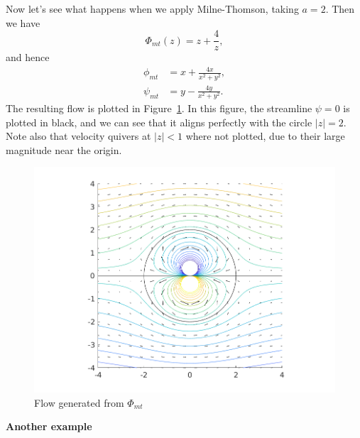 \documentclass{article}
\begin{document}
Now let's see what happens when we apply Milne-Thomson, taking $a = 2$. Then we have
%
\begin{equation*}
    \Phi_{mt}(z) = z + \frac{4}{z}
    ,
\end{equation*}
%
and hence
%
\begin{align*}
    \phi_{mt} &= x + \frac{4 x}{x^2 + y^2}, \\
    \psi_{mt} &= y - \frac{4 y}{x^2 + y^2}
    .
\end{align*}
%
The resulting flow is plotted in Figure~\ref{fig:mt-2}. In this
figure, the streamline $\psi = 0$ is plotted in black, and we can
see that it aligns perfectly with the circle $|z| = 2$. Note also that
velocity quivers at $|z| < 1$ where not plotted, due to their large
magnitude near the origin.
%
\begin{figure}[ht]
    \includegraphics[width=35em]{mt_ex1_2}
    \centering
    \caption{Flow generated from $\Phi_{mt}$}
    \label{fig:mt-2}
\end{figure}

\textbf{Another example}
\end{document}
